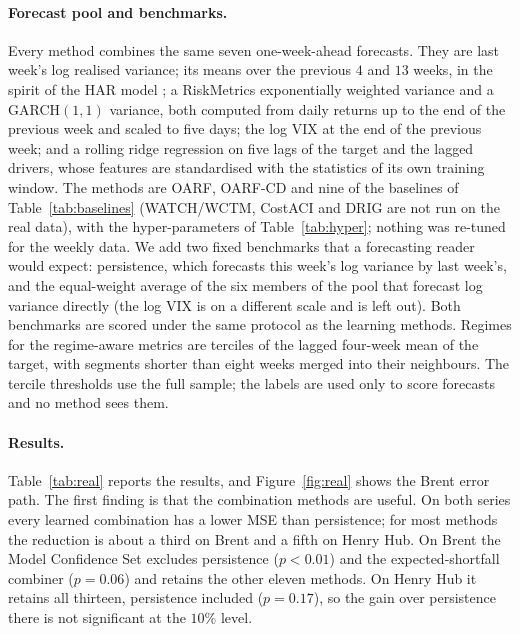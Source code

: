 \documentclass[12pt]{article}
\theoremstyle{plain}
\theoremstyle{remark}
\newcommand{\OARF}{\textsc{OARF}}
\newcommand{\OARFCD}{\textsc{OARF-CD}}
\begin{document}
\paragraph{Forecast pool and benchmarks.}
Every method combines the same seven one-week-ahead forecasts. They are last week's log
realised variance; its means over the previous $4$ and $13$ weeks, in the spirit of the
HAR model \citep{corsi2009har}; a RiskMetrics exponentially weighted variance and a
GARCH$(1,1)$ variance, both computed from daily returns up to the end of the previous
week and scaled to five days; the log VIX at the end of the previous week; and a
rolling ridge regression on five lags of the target and the lagged drivers, whose
features are standardised with the statistics of its own training window. The methods
are \OARF{}, \OARFCD{} and nine of the baselines of Table~\ref{tab:baselines}
(WATCH/WCTM, CostACI and DRIG are not run on the real data), with the hyper-parameters
of Table~\ref{tab:hyper}; nothing was re-tuned for the weekly data. We add two fixed
benchmarks that a forecasting reader would expect: persistence, which forecasts this
week's log variance by last week's, and the equal-weight average of the six members of
the pool that forecast log variance directly (the log VIX is on a different scale and
is left out). Both benchmarks are scored under the same protocol as the learning
methods. Regimes for the regime-aware metrics are terciles of the lagged four-week mean
of the target, with segments shorter than eight weeks merged into their neighbours.
The tercile thresholds use the full sample; the labels are used only to score
forecasts and no method sees them.

\paragraph{Results.}
Table~\ref{tab:real} reports the results, and Figure~\ref{fig:real} shows the Brent
error path. The first finding is that the combination methods are useful. On both
series every learned combination has a lower MSE than persistence; for most methods
the reduction is about a third on Brent and a fifth on Henry Hub. On Brent the Model Confidence Set excludes
persistence ($p<0.01$) and the expected-shortfall combiner ($p=0.06$) and retains the
other eleven methods. On Henry Hub it retains all thirteen, persistence included
($p=0.17$), so the gain over persistence there is not significant at the $10\%$ level.
\end{document}
